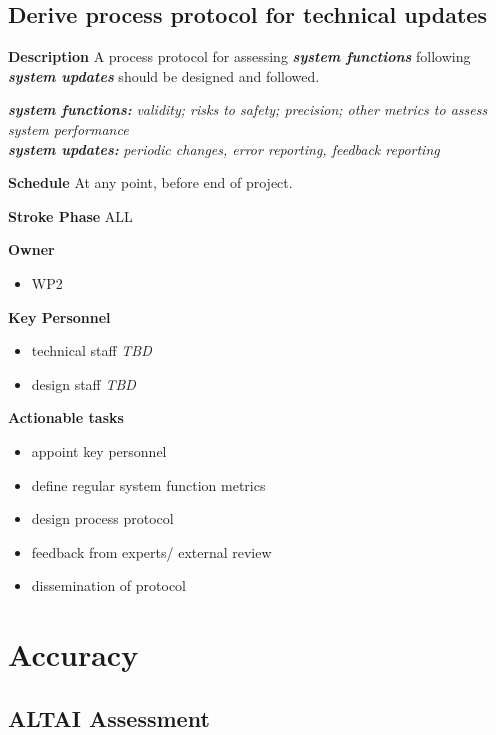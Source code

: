\documentclass[
  letterpaper,
  DIV=11,
  numbers=noendperiod]{scrreport}
\providecommand{\tightlist}{%
  \setlength{\itemsep}{0pt}\setlength{\parskip}{0pt}}\usepackage{longtable,booktabs,array}
\begin{document}
\hypertarget{derive-process-protocol-for-technical-updates}{%
\subsection{Derive process protocol for technical
updates}\label{derive-process-protocol-for-technical-updates}}

\textbf{Description} A process protocol for assessing
\textbf{\emph{system functions}} following \textbf{\emph{system
updates}} should be designed and followed.

\textbf{\emph{system functions:}} \emph{validity; risks to safety;
precision; other metrics to assess system performance}\\
\textbf{\emph{system updates:}} \emph{periodic changes, error reporting,
feedback reporting}

\textbf{Schedule} At any point, before end of project.

\textbf{Stroke Phase} ALL

\textbf{Owner}

\begin{itemize}
\tightlist
\item
  WP2
\end{itemize}

\textbf{Key Personnel}

\begin{itemize}
\tightlist
\item
  technical staff \emph{TBD}
\item
  design staff \emph{TBD}
\end{itemize}

\textbf{Actionable tasks}

\begin{itemize}
\tightlist
\item
  appoint key personnel
\item
  define regular system function metrics
\item
  design process protocol
\item
  feedback from experts/ external review
\item
  dissemination of protocol
\end{itemize}

\hypertarget{accuracy}{%
\section{Accuracy}\label{accuracy}}

\hypertarget{altai-assessment-4}{%
\subsection*{ALTAI Assessment}\label{altai-assessment-4}}
\end{document}
